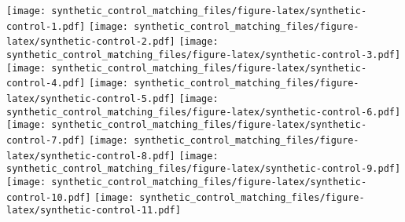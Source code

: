 \documentclass[
]{article}
\begin{document}
\texttt{[image: synthetic\_control\_matching\_files/figure-latex/synthetic-control-1.pdf]}
\texttt{[image: synthetic\_control\_matching\_files/figure-latex/synthetic-control-2.pdf]}
\texttt{[image: synthetic\_control\_matching\_files/figure-latex/synthetic-control-3.pdf]}
\texttt{[image: synthetic\_control\_matching\_files/figure-latex/synthetic-control-4.pdf]}
\texttt{[image: synthetic\_control\_matching\_files/figure-latex/synthetic-control-5.pdf]}
\texttt{[image: synthetic\_control\_matching\_files/figure-latex/synthetic-control-6.pdf]}
\texttt{[image: synthetic\_control\_matching\_files/figure-latex/synthetic-control-7.pdf]}
\texttt{[image: synthetic\_control\_matching\_files/figure-latex/synthetic-control-8.pdf]}
\texttt{[image: synthetic\_control\_matching\_files/figure-latex/synthetic-control-9.pdf]}
\texttt{[image: synthetic\_control\_matching\_files/figure-latex/synthetic-control-10.pdf]}
\texttt{[image: synthetic\_control\_matching\_files/figure-latex/synthetic-control-11.pdf]}
\end{document}
